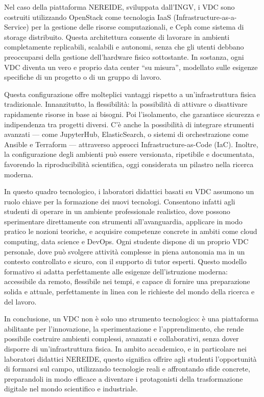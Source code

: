 \documentclass[12pt,a4paper,openright,twoside]{book}
\begin{document}
Nel caso della piattaforma NEREIDE, sviluppata dall'INGV, i VDC sono costruiti utilizzando OpenStack come tecnologia IaaS (Infrastructure-as-a-Service) per la gestione delle risorse computazionali, e Ceph come sistema di storage distribuito.
Questa architettura consente di lavorare in ambienti completamente replicabili, scalabili e autonomi, senza che gli utenti debbano preoccuparsi della gestione dell'hardware fisico sottostante.
In sostanza, ogni VDC diventa un vero e proprio data center “su misura”, modellato sulle esigenze specifiche di un progetto o di un gruppo di lavoro.

Questa configurazione offre molteplici vantaggi rispetto a un'infrastruttura fisica tradizionale. Innanzitutto, la flessibilità: la possibilità di attivare o disattivare rapidamente risorse in base ai bisogni.
Poi l'isolamento, che garantisce sicurezza e indipendenza tra progetti diversi. C'è anche la possibilità di integrare strumenti avanzati — come JupyterHub, ElasticSearch, o sistemi di orchestrazione come Ansible e Terraform — attraverso approcci Infrastructure-as-Code (IaC).
Inoltre, la configurazione degli ambienti può essere versionata, ripetibile e documentata, favorendo la riproducibilità scientifica, oggi considerata un pilastro nella ricerca moderna.

In questo quadro tecnologico, i laboratori didattici basati su VDC assumono un ruolo chiave per la formazione dei nuovi tecnologi. Consentono infatti agli studenti di operare in un ambiente professionale realistico,
dove possono sperimentare direttamente con strumenti all'avanguardia, applicare in modo pratico le nozioni teoriche, e acquisire competenze concrete in ambiti come cloud computing, data science e DevOps.
Ogni studente dispone di un proprio VDC personale, dove può svolgere attività complesse in piena autonomia ma in un contesto controllato e sicuro, con il supporto di tutor esperti. 
Questo modello formativo si adatta perfettamente alle esigenze dell'istruzione moderna: accessibile da remoto, flessibile nei tempi, e capace di fornire una preparazione solida e attuale, perfettamente in linea con le richieste del mondo della ricerca e del lavoro.

In conclusione, un VDC non è solo uno strumento tecnologico: è una piattaforma abilitante per l'innovazione, la sperimentazione e l'apprendimento, che rende possibile costruire ambienti complessi, avanzati e collaborativi, senza dover disporre di un'infrastruttura fisica.
In ambito accademico, e in particolare nei laboratori didattici NEREIDE, questo significa offrire agli studenti l'opportunità di formarsi sul campo, utilizzando tecnologie reali e affrontando sfide concrete, preparandoli in modo efficace a diventare i protagonisti della trasformazione digitale nel mondo scientifico e industriale.
\end{document}

